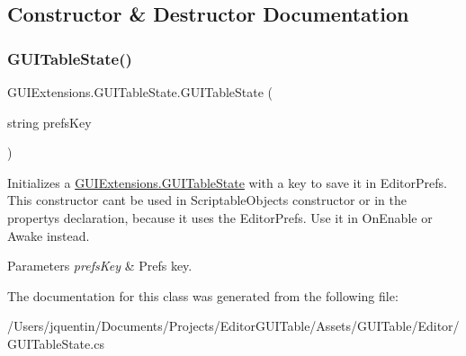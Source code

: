 \subsection{Constructor \& Destructor Documentation}
\mbox{\label{class_g_u_i_extensions_1_1_g_u_i_table_state_aa1c174fc584bf84ed57022fc04171298}} 
\subsubsection{\texorpdfstring{G\+U\+I\+Table\+State()}{GUITableState()}}
{\footnotesize\ttfamily G\+U\+I\+Extensions.\+G\+U\+I\+Table\+State.\+G\+U\+I\+Table\+State (\begin{DoxyParamCaption}\item[{string}]{prefs\+Key }\end{DoxyParamCaption})}



Initializes a \mbox{\hyperlink{class_g_u_i_extensions_1_1_g_u_i_table_state}{G\+U\+I\+Extensions.\+G\+U\+I\+Table\+State}} with a key to save it in Editor\+Prefs. This constructor can\textquotesingle{}t be used in Scriptable\+Object\textquotesingle{}s constructor or in the property\textquotesingle{}s declaration, because it uses the Editor\+Prefs. Use it in On\+Enable or Awake instead. 


\begin{DoxyParams}{Parameters}
{\em prefs\+Key} & Prefs key.\\
\hline
\end{DoxyParams}


The documentation for this class was generated from the following file\+:\begin{DoxyCompactItemize}
\item 
/\+Users/jquentin/\+Documents/\+Projects/\+Editor\+G\+U\+I\+Table/\+Assets/\+G\+U\+I\+Table/\+Editor/G\+U\+I\+Table\+State.\+cs\end{DoxyCompactItemize}
